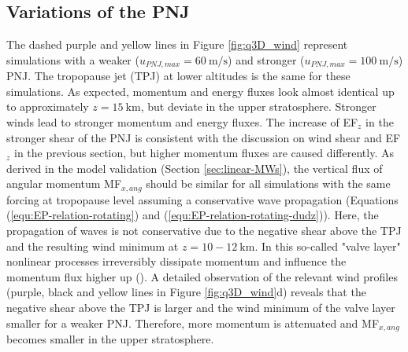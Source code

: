 \subsection*{Variations of the PNJ}
The dashed purple and yellow lines in Figure \ref{fig:q3D_wind} represent simulations with a weaker ($u_{PNJ,max}=\SI{60}{\meter\per\second}$) and stronger ($u_{PNJ,max}=\SI{100}{\meter\per\second}$) PNJ. The tropopause jet (TPJ) at lower altitudes is the same for these simulations. As expected, momentum and energy fluxes look almost identical up to approximately $z=\SI{15}{\kilo\meter}$, but deviate in the upper stratosphere. Stronger winds lead to stronger momentum and energy fluxes. The increase of EF$_z$ in the stronger shear of the PNJ is consistent with the discussion on wind shear and EF$_z$ in the previous section, but higher momentum fluxes are caused differently. As derived in the model validation (Section \ref{sec:linear-MWs}), the vertical flux of angular momentum MF$_{x,ang}$ should be similar for all simulations with the same forcing at tropopause level assuming a conservative wave propagation (Equations (\ref{equ:EP-relation-rotating}) and (\ref{equ:EP-relation-rotating-dudz})). Here, the propagation of waves is not conservative due to the negative shear above the TPJ and the resulting wind minimum at $z=10-\SI{12}{\kilo\meter}$. In this so-called "valve layer" nonlinear processes irreversibly dissipate momentum and influence the momentum flux higher up (\cite[]{kruse_midlatitude_2016}). A detailed observation of the relevant wind profiles (purple, black and yellow lines in Figure \ref{fig:q3D_wind}d) reveals that the negative shear above the TPJ is larger and the wind minimum of the valve layer smaller for a weaker PNJ. Therefore, more momentum is attenuated and MF$_{x,ang}$ becomes smaller in the upper stratosphere.
%
